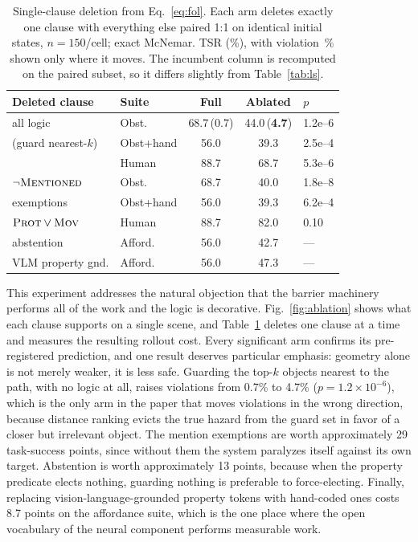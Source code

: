 \documentclass[conference]{IEEEtran}
\begin{document}
\begin{table}[t]
\centering
\caption{Single-clause deletion from Eq.~\eqref{eq:fol}. Each arm deletes exactly one clause with everything else paired 1:1 on identical initial states, $n{=}150$/cell; exact McNemar. TSR (\%), with violation~\% shown only where it moves. The incumbent column is recomputed on the paired subset, so it differs slightly from Table~\ref{tab:ls}.}
\label{tab:ablation}
\setlength{\tabcolsep}{3pt}
\footnotesize
\begin{tabular}{@{}llccl@{}}
\toprule
Deleted clause & Suite & Full & Ablated & $p$ \\
\midrule
all logic          & Obst.     & 68.7\,{\scriptsize(0.7)} & 44.0\,{\scriptsize(\textbf{4.7})} & 1.2e--6 \\
\;\;(guard nearest-$k$) & Obst+hand & 56.0 & 39.3 & 2.5e--4 \\
                   & Human     & 88.7 & 68.7 & 5.3e--6 \\
\midrule
$\lnot\textsc{Mentioned}$   & Obst.     & 68.7 & 40.0 & 1.8e--8 \\
\;\;exemptions     & Obst+hand & 56.0 & 39.3 & 6.2e--4 \\
\midrule
$\textsc{Prot}\vee\textsc{Mov}$ & Human & 88.7 & 82.0 & 0.10 \\
abstention         & Afford.   & 56.0 & 42.7 & --- \\
VLM property gnd.  & Afford.   & 56.0 & 47.3 & --- \\
\bottomrule
\end{tabular}
\end{table}

This experiment addresses the natural objection that the barrier machinery performs all of the work and the logic is decorative. Fig.~\ref{fig:ablation} shows what each clause supports on a single scene, and Table~\ref{tab:ablation} deletes one clause at a time and measures the resulting rollout cost. Every significant arm confirms its pre-registered prediction, and one result deserves particular emphasis: geometry alone is not merely weaker, it is less safe. Guarding the top-$k$ objects nearest to the path, with no logic at all, raises violations from 0.7\% to 4.7\% ($p=1.2\times10^{-6}$), which is the only arm in the paper that moves violations in the wrong direction, because distance ranking evicts the true hazard from the guard set in favor of a closer but irrelevant object. The mention exemptions are worth approximately 29 task-success points, since without them the system paralyzes itself against its own target. Abstention is worth approximately 13 points, because when the property predicate elects nothing, guarding nothing is preferable to force-electing. Finally, replacing vision-language-grounded property tokens with hand-coded ones costs 8.7 points on the affordance suite, which is the one place where the open vocabulary of the neural component performs measurable work.
\end{document}
